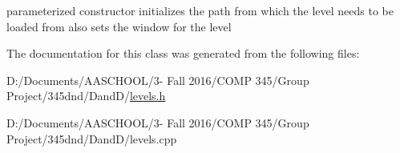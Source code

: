parameterized constructor initializes the path from which the level needs to be loaded from also sets the window for the level 

The documentation for this class was generated from the following files\+:\begin{DoxyCompactItemize}
\item 
D\+:/\+Documents/\+A\+A\+S\+C\+H\+O\+O\+L/3-\/ Fall 2016/\+C\+O\+M\+P 345/\+Group Project/345dnd/\+Dand\+D/\hyperlink{levels_8h}{levels.\+h}\item 
D\+:/\+Documents/\+A\+A\+S\+C\+H\+O\+O\+L/3-\/ Fall 2016/\+C\+O\+M\+P 345/\+Group Project/345dnd/\+Dand\+D/levels.\+cpp\end{DoxyCompactItemize}
